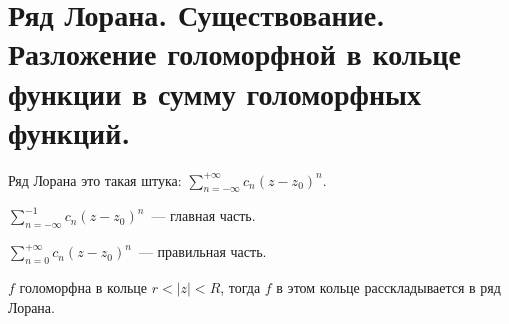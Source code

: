 \section{Ряд Лорана. Существование. Разложение голоморфной в кольце функции в сумму голоморфных функций.}

\begin{definition}
    Ряд Лорана это такая штука:
    $\sum\limits_{n=-\infty}^{+\infty} c_n(z-z_0)^n$.
\end{definition}

\begin{definition}
    $\sum\limits_{n=-\infty}^{-1} c_n(z-z_0)^n$~--- главная часть.
\end{definition}

\begin{definition}
    $\sum\limits_{n=0}^{+\infty} c_n(z-z_0)^n$~--- правильная часть.
\end{definition}


\begin{theorem}[Лоран]

    $f$ голоморфна в кольце $r < |z| < R$,
    тогда $f$ в этом кольце расскладывается в ряд Лорана.
\end{theorem}

